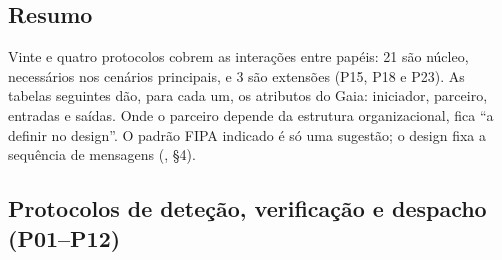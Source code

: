 \documentclass[10pt,a4paper]{article}
\begin{document}
\subsection{Resumo}\label{sec:interacoes-resumo}

Vinte e quatro protocolos cobrem as interações entre papéis: 21 são núcleo, necessários nos cenários principais, e 3 são extensões (P15, P18 e P23). As tabelas seguintes dão, para cada um, os atributos do Gaia: iniciador, parceiro, entradas e saídas. Onde o parceiro depende da estrutura organizacional, fica ``a definir no design''. O padrão FIPA indicado é só uma sugestão; o design fixa a sequência de mensagens (, §4).

\subsection{Protocolos de deteção, verificação e despacho (P01--P12)}\label{sec:protocolos1}
\end{document}
